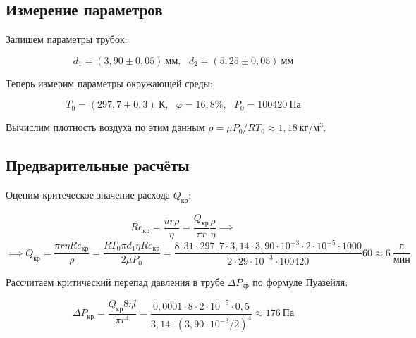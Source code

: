 \documentclass[a4paper,12pt]{article}
\begin{document}
\subsection{Измерение параметров}

Запишем параметры трубок:

\begin{equation*}
    d_1 = (3,90 \pm 0,05) \ \text{мм}, \ \ \ d_2 = (5,25 \pm 0,05) \ \text{мм}
\end{equation*}

Теперь измерим параметры окружающей среды:

\begin{equation*}
    T_0 = (297,7 \pm 0,3) \ \text{К}, \ \ \ \varphi = 16,8 \%, \ \ \ P_0 = 100420 \ \text{Па}
\end{equation*}

Вычислим плотность воздуха по этим данным $\rho = \mu P_0 / R T_0 \approx 1,18 \ \text{кг}/\text{м}^3$.



\subsection{Предварительные расчёты}
\label{p:4}

Оценим критеческое значение расхода $Q_\text{кр}$:

\begin{equation*}
    Re_\text{кр} = \frac{\overline{u} r \rho}{\eta} = \frac{Q_\text{кр}}{\pi r} \frac{\rho}{\eta} \implies 
\end{equation*}
\begin{equation*}
    \implies Q_\text{кр} = \frac{\pi r \eta Re_\text{кр}}{\rho} = \frac{R T_0 \pi d_1 \eta Re_\text{кр}}{2 \mu P_0} = \frac{8,31 \cdot 297,7 \cdot 3,14 \cdot 3,90 \cdot 10^{-3} \cdot 2 \cdot 10^{-5} \cdot 1000}{2 \cdot 29 \cdot 10^{-3} \cdot 100420} 60 \approx 6 \ \frac{\text{л}}{\text{мин}} 
\end{equation*}

Рассчитаем критический перепад давления в трубе $\Delta P_\text{кр}$ по формуле Пуазейля:

\begin{equation*}
    \Delta P_\text{кр} = \frac{Q_\text{кр} 8 \eta l }{\pi r^4} = \frac{0,0001 \cdot 8 \cdot 2 \cdot 10^{-5} \cdot 0,5}{3,14 \cdot (3,90 \cdot 10^{-3} / 2)^4} \approx 176 \ \text{Па}
\end{equation*}
\end{document}
